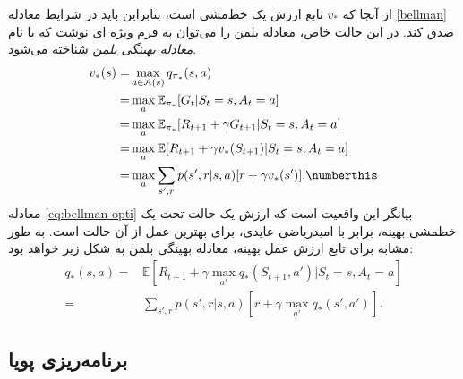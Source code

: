 از آنجا که $v_*$ تابع ارزش یک خط‌مشی است، بنابراین باید در شرایط معادله \ref{bellman} صدق کند.
در این حالت خاص، معادله بلمن را می‌توان به فرم ویژه ای نوشت که با نام
 \textit{معادله بهینگی بلمن}
شناخته می‌شود.
\begin{align}
  v_{*}(s)= &\max_{a \in \EuScript{A}(s)} q_{\pi_*}(s,a) \nonumber \\
      =& \max_{a} \mathbb{E}_{\pi_*} [G_t|S_t=s, A_t=a] \nonumber \\ 
      =& \max_{a} \mathbb{E}_{\pi_*} [R_{t+1} + \gamma G_{t+1} | S_t=s, A_t=a] \nonumber \\ 
      =& \max_{a} \mathbb{E} [R_{t+1} + \gamma v_*(S_{t+1}) | S_t= s, A_t = a] \nonumber \\
      =& \max_{a} \sum_{s',r} p(s',r|s,a) [r + \gamma v_*(s')]. \numberthis
\label{eq:bellman-opti}
\end{align}
معادله 
\ref{eq:bellman-opti}
 بیانگر این واقعیت است که ارزش یک حالت تحت یک خط\nf مشی بهینه، برابر با امیدریاضی عایدی، برای بهترین عمل از آن حالت است. به طور مشابه برای تابع ارزش عمل بهینه، معادله بهینگی بلمن به شکل زیر خواهد بود:
\begin{align}
q_*(s,a) =& \mathbb{E}\left[R_{t+1} + \gamma \max_{a'} q_*(S_{t+1},a')| S_t=s, A_t=a \right] \nonumber\\
=& \sum_{s',r} p(s',r|s,a) \left[r + \gamma \max_{a'} q_*(s',a')\right] 
\label{eq:2}.
\end{align}

\subsection{برنامه‌ریزی پویا}


